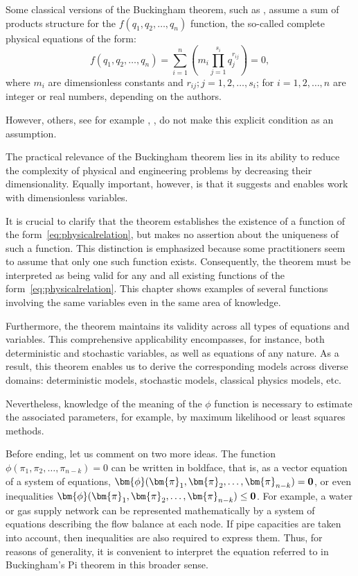 Some classical versions of the Buckingham theorem, such as \cite{buckingham1914}, assume a sum of products structure for the $f(q_1, q_2, \ldots, q_n)$ function, the so-called complete physical equations of the form:
\begin{equation}
f(q_1, q_2, \ldots, q_n) = \sum\limits_{i=1}^n \left( m_i \prod\limits_{j=1}^{s_i}q_j^{r_{ij}}\right)=0,
\label{eq:generalphysical}
\end{equation}
where $m_i$ are dimensionless constants and $r_{ij};j=1,2, \ldots, s_i$; for $i=1,2, \ldots, n$ are integer or real numbers, depending on the authors.

However, others, see for example \cite{Boyling:79}, \cite{CurtisLP:82}, do not make this explicit condition as an assumption.

The practical relevance of the Buckingham theorem lies in its ability to reduce the complexity of physical and engineering problems by decreasing their dimensionality. Equally important, however, is that it suggests and enables work with dimensionless variables.

It is crucial to clarify that the theorem establishes the existence of a function of the form~\eqref{eq:physicalrelation}, but makes no assertion about the uniqueness of such a function. This distinction is emphasized because some practitioners seem to assume that only one such function exists. Consequently, the theorem must be interpreted as being valid for any and all existing functions of the form~\eqref{eq:physicalrelation}. This chapter shows examples of several functions involving the same variables even in the same area of knowledge.

Furthermore, the theorem maintains its validity across all types of equations and variables. This comprehensive applicability encompasses, for instance, both deterministic and stochastic variables, as well as equations of any nature. As a result, this theorem enables us to derive the corresponding models across diverse domains: deterministic models, stochastic models, classical physics models, etc.

Nevertheless, knowledge of the meaning of the $\phi$ function is necessary to estimate the associated parameters, for example, by maximum likelihood or least squares methods.

Before ending, let us comment on two more ideas. The function $\phi(\pi_1,\pi_2,\ldots,\pi_{n-k}) = 0$ can be written in boldface, that is, as a vector equation of a system of equations, ${\bm{\phi}}(\bm{\pi}_1,\bm{\pi}_2,\ldots,\bm{\pi}_{n-k}) = {\bf 0}$, or even inequalities ${\bm{\phi}}(\bm{\pi}_1,\bm{\pi}_2,\ldots,\bm{\pi}_{n-k}) \le {\bf 0}$. For example, a water or gas supply network can be represented mathematically by a system of equations describing the flow balance at each node. If pipe capacities are taken into account, then inequalities are also required to express them. Thus, for reasons of generality, it is convenient to interpret the equation referred to in Buckingham's Pi theorem in this broader sense.

